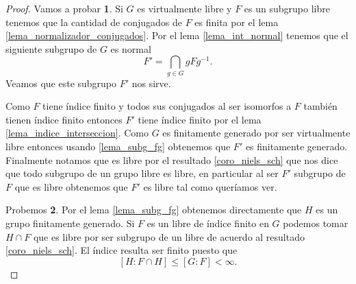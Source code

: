 \documentclass[tesis.tex]{subfiles}
\begin{document}
\begin{proof}
	Vamos a probar \textbf{1}.
	Si $G$ es virtualmente libre y $F$ es un subgrupo libre tenemos que la cantidad de conjugados de $F$ es finita por el lema \ref{lema_normalizador_conjugados}.
	Por el lema \ref{lema_int_normal} tenemos que el siguiente subgrupo de $G$ es normal
	\[
	F' = \bigcap_{g \in G} gFg^{-1}.
	\]
	Veamos que este subgrupo $F'$ nos sirve. 
	
	
	Como $F$ tiene índice finito y todos sus conjugados al ser isomorfos a $F$ también tienen índice finito entonces $F'$ tiene índice finito por el lema \ref{lema_indice_interseccion}.
	Como $G$ es finitamente generado por ser virtualmente libre entonces usando \ref{lema_subg_fg} obtenemos que $F'$ es finitamente generado.
	Finalmente notamos que es libre por el resultado \ref{coro_niels_sch} que nos dice que todo subgrupo de un grupo libre es libre, en particular al ser $F'$ subgrupo de $F$ que es libre obtenemos que $F'$ es libre tal como queríamos ver.
	
	Probemos \textbf{2}. 
	Por el lema \ref{lema_subg_fg} obtenemos directamente que $H$ es un grupo finitamente generado.
	Si $F$ es un libre de índice finito en $G$ podemos tomar $H \cap F$ que es libre por ser subgrupo de un libre de acuerdo al resultado \ref{coro_niels_sch}.
	El índice resulta ser finito puesto que 
	\[
	[H:F\cap H] \le [G:F] < \infty.
	\]
\end{proof}
\end{document}
